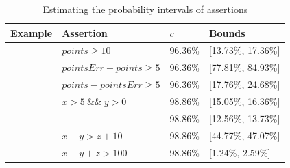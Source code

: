 \documentclass[conference]{IEEEtran}
\begin{document}
\begin{table}[htb]
	\centering
	\caption{Estimating the probability intervals of assertions}
	\label{AssertionsResults} 
	\begin{tabular}{|m{55pt}<{\centering} |m{130pt}<{\centering} |m{50pt}<{\centering} |m{85pt}<{\centering}|}
		\hline  
		Example & Assertion &  $c$ & Bounds \\ \hline

		\multirow{3}{*}{\makecell[c]{framingham}}
		& $points \geq 10$ & 96.36\% & [13.73\%, 17.36\%] \\ \cline{2-4}
		& $pointsErr-points \geq 5$ & 96.36\% & [77.81\%, 84.93\%]  \\ \cline{2-4}
		& $points-pointsErr \geq 5$ & 96.36\% & [17.76\%, 24.68\%]  \\ \hline
		\multirow{5}{*}{\makecell[c]{sum-three}}
		& $x>5 \ \&\& \ y>0$ & 98.86\% & [15.05\%, 16.36\%]  \\ \cline{2-4}
		&  \makecell[c]{$x>0 \ \&\&\ y>0 \&\& \ z>0$} & 98.86\% & [12.56\%, 13.73\%] \\ \cline{2-4}
		& $x+y>z+10$ & 98.86\% & [44.77\%, 47.07\%] \\ \cline{2-4}
		& $x+y+z>100$ & 98.86\% & [1.24\%, 2.59\%]  \\ \hline

	\end{tabular}  
\end{table}
\end{document}
